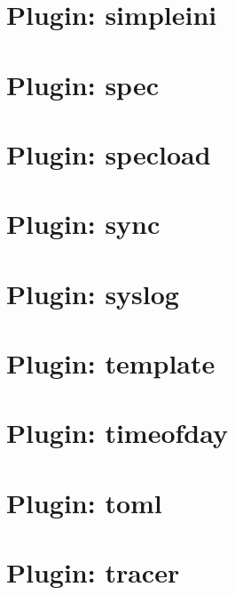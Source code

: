 \let\mypdfximage\pdfximage\def\pdfximage{\immediate\mypdfximage}\documentclass[twoside]{book}
\newcommand{\+}{\discretionary{\mbox{\scriptsize$\hookleftarrow$}}{}{}}
\begin{document}
\chapter{Plugin\+: simpleini}
\label{md_src_plugins_simpleini_README}

\chapter{Plugin\+: spec}
\label{md_src_plugins_spec_README}

\chapter{Plugin\+: specload}
\label{md_src_plugins_specload_README}

\chapter{Plugin\+: sync}
\label{md_src_plugins_sync_README}

\chapter{Plugin\+: syslog}
\label{md_src_plugins_syslog_README}

\chapter{Plugin\+: template}
\label{md_src_plugins_template_README}

\chapter{Plugin\+: timeofday}
\label{md_src_plugins_timeofday_README}

\chapter{Plugin\+: toml}
\label{md_src_plugins_toml_README}

\chapter{Plugin\+: tracer}
\label{md_src_plugins_tracer_README}

\end{document}

